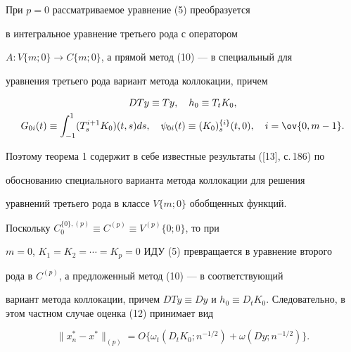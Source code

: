  


\begin{note} 


При $p=0$ рассматриваемое уравнение (5) преобразуется 


в интегральное уравнение третьего рода с оператором 


$A:V\{m;0\}\to C\{m;0\}$, а прямой метод (10) --- в специальный для 


уравнения третьего рода вариант метода коллокации, причем 


\begin{gather*} 


D T y\equiv T y,\quad h_0\equiv T_t K_0,\\ 


G_{0i}(t)\equiv\int^1_{-1}(T^{i+1}_s K_0)(t,s)d s,\quad 


\psi_{0i}(t)\equiv(K_0)^{\{i\}}_s(t,0),\quad i=\ov{0,m-1}. 


\end{gather*} 


Поэтому теорема 1 содержит в себе известные результаты ([13], с.\,186) по 


обоснованию специального варианта метода коллокации для решения 


уравнений третьего рода в классе $V\{m;0\}$ обобщенных функций. 


\end{note} 


 


\begin{note} 


Поскольку $C^{\{0\},(p)}_0{\equiv} C^{(p)}{\equiv} V^{(p)}\{0;0\}$, то при 


$m{=}0$, $K_1=K_2=\dotsb=K_p=0$ ИДУ (5) превращается в уравнение второго 


рода в $C^{(p)}$, а предложенный метод (10) --- в соответствующий 


вариант метода коллокации, причем $D T y\equiv D y$ и $h_0\equiv D_t 


K_0$. Следовательно, в этом частном случае оценка (12) принимает вид 


$$ 


\|x^*_n-x^*\|_{(p)}=O\{\omega_t(D_t K_0;n^{-1/2})+\omega 


(D y;n^{-1/2})\}. 


$$ 


\end{note} 


